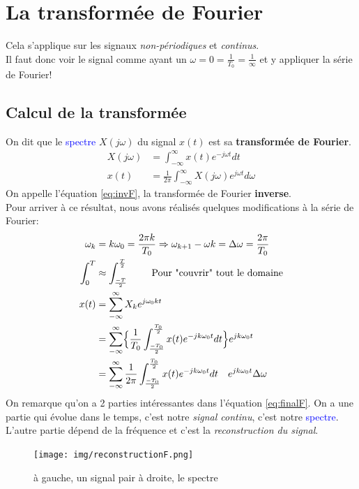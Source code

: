 \documentclass{report}
\begin{document}
\section{La transformée de Fourier} \label{Fourier}
Cela s'applique sur les signaux \textit{non-périodiques} et \textit{continus}.\\
Il faut donc voir le signal comme ayant un $\omega = 0 = \frac{1}{T_0} = \frac{1}{\infty}$ et y appliquer la série de Fourier!

\subsection{Calcul de la transformée}
On dit que le \textcolor{blue}{spectre} $X(j\omega)$ du signal $x(t)$ est sa \textbf{transformée de Fourier}.
\begin{align}
X(j\omega) &= \int_{-\infty}^{\infty} x(t) e^{-j \omega t}dt\\
x(t) &= \frac{1}{2\pi} \int_{-\infty}^{\infty} X(j\omega) e^{j\omega t} d\omega \label{eq:invF}
\end{align}
On appelle l'équation \ref{eq:invF}, la transformée de Fourier \textbf{inverse}.\\

Pour arriver à ce résultat, nous avons réalisés quelques modifications à la série de Fourier:
\begin{align}
\omega_k &= k \omega_0 = \frac{2 \pi k}{T_0} \Rightarrow \omega_{k+1} - \omega{k} = \Delta \omega = \frac{2\pi}{T_0}\\
\int_0^{T} & \approx \int_{\frac{-T}{2}}^{\frac{T}{2}} \qquad \text{ Pour "couvrir" tout le domaine}\\
x(t) &= \sum_{-\infty}^{\infty} X_k e^{j \omega_0 k t}\\
	 &= \sum_{-\infty}^{\infty} \Bigl \{ \frac{1}{T_0} \int_{\frac{-T_0}{2}}^{\frac{T_0}{2}} x(t) e^{-j k \omega_0 t} dt \Bigl \} e^{j k \omega_0 t}\\
	 &= \sum_{-\infty}^{\infty} \frac{1}{2 \pi} \int_{\frac{-T_0}{2}}^{\frac{T_0}{2}} x(t) e^{-j k \omega_0 t} dt\quad e^{j k \omega_0 t} \Delta \omega \label{eq:finalF}
\end{align} 
On remarque qu'on a 2 parties intéressantes dans l'équation \ref{eq:finalF}. On a une partie qui évolue dans le temps, c'est notre \textit{signal continu}, c'est notre \textcolor{blue}{spectre}. L'autre partie dépend de la fréquence et c'est la \textit{reconstruction du signal}. 
\begin{figure}[H]
\centering
\texttt{[image: img/reconstructionF.png]}
\caption{à gauche, un signal pair \qquad à droite, le spectre}
\end{figure}
\end{document}
